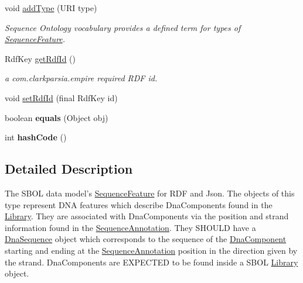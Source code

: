 \begin{DoxyCompactItemize}
void \hyperlink{classorg_1_1sbolstandard_1_1lib_s_b_o_lj_1_1_sequence_feature_a26d3aea2567e9235daef5a79a5e6a521}{addType} (URI type)
\begin{DoxyCompactList}\small\item\em Sequence Ontology vocabulary provides a defined term for types of \hyperlink{classorg_1_1sbolstandard_1_1lib_s_b_o_lj_1_1_sequence_feature}{SequenceFeature}. \item\end{DoxyCompactList}\item 
RdfKey \hyperlink{classorg_1_1sbolstandard_1_1lib_s_b_o_lj_1_1_sequence_feature_a98d34c30847c78a8922be878a2fa4d49}{getRdfId} ()
\begin{DoxyCompactList}\small\item\em a com.clarkparsia.empire required RDF id. \item\end{DoxyCompactList}\item 
void \hyperlink{classorg_1_1sbolstandard_1_1lib_s_b_o_lj_1_1_sequence_feature_afe8d2a1ced8871ba217ddf364366da99}{setRdfId} (final RdfKey id)
\item 
\hypertarget{classorg_1_1sbolstandard_1_1lib_s_b_o_lj_1_1_sequence_feature_ae3ce8ca5a04e8966a9d2158aeeecfc16}{
boolean {\bfseries equals} (Object obj)}
\label{classorg_1_1sbolstandard_1_1lib_s_b_o_lj_1_1_sequence_feature_ae3ce8ca5a04e8966a9d2158aeeecfc16}

\item 
\hypertarget{classorg_1_1sbolstandard_1_1lib_s_b_o_lj_1_1_sequence_feature_a077e18fe97323c7194e2665ffc766399}{
int {\bfseries hashCode} ()}
\label{classorg_1_1sbolstandard_1_1lib_s_b_o_lj_1_1_sequence_feature_a077e18fe97323c7194e2665ffc766399}

\end{DoxyCompactItemize}


\subsection{Detailed Description}
The SBOL data model's \hyperlink{classorg_1_1sbolstandard_1_1lib_s_b_o_lj_1_1_sequence_feature}{SequenceFeature} for RDF and Json. The objects of this type represent DNA features which describe DnaComponents found in the \hyperlink{classorg_1_1sbolstandard_1_1lib_s_b_o_lj_1_1_library}{Library}. They are associated with DnaComponents via the position and strand information found in the \hyperlink{classorg_1_1sbolstandard_1_1lib_s_b_o_lj_1_1_sequence_annotation}{SequenceAnnotation}. They SHOULD have a \hyperlink{classorg_1_1sbolstandard_1_1lib_s_b_o_lj_1_1_dna_sequence}{DnaSequence} object which corresponds to the sequence of the \hyperlink{classorg_1_1sbolstandard_1_1lib_s_b_o_lj_1_1_dna_component}{DnaComponent} starting and ending at the \hyperlink{classorg_1_1sbolstandard_1_1lib_s_b_o_lj_1_1_sequence_annotation}{SequenceAnnotation} position in the direction given by the strand. DnaComponents are EXPECTED to be found inside a SBOL \hyperlink{classorg_1_1sbolstandard_1_1lib_s_b_o_lj_1_1_library}{Library} object.

